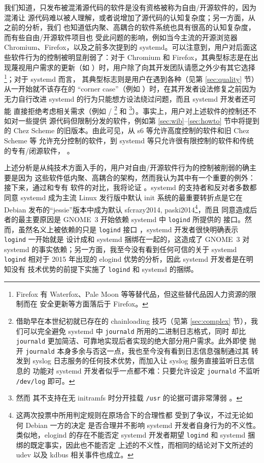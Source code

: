 我们知道，只发布被混淆源代码的软件是没有资格被称为自由/开源软件的，因为混淆让
源代码难以被人理解，或者说增加了源代码的认知复杂度；另一方面，从之前的分析，我们
也知道低内聚、高耦合的软件系统也具有很高的认知复杂度，而有些自由/开源软件项目也
受此问题的影响，例如当今主流的开源浏览器 Chromium、Firefox，以及之前多次提到的
systemd。可以注意到，用户对后面这些软件行为的控制被明显削弱了：对于 Chromium
和 Firefox，其典型标志是在出现蔑视用户需求的更新（如 \parencite{beauhd2019,
namelessvoice2018}）时，用户除了向其开发团队请愿之外少有其它选择\footnote{%
Firefox 有 Waterfox、Pale Moon 等等替代品，但这些替代品因人力资源的限制而在
安全更新等方面落后于 Firefox。}；对于 systemd 而言，
其典型标志则是用户在遇到各种（见第 \ref{sec:quality} 节）从一开始就不该存在的
“corner case”（例如 \parencite{ratagupt2017}）时，在其开发者设法修复之前因为
无力自行改进 systemd 的行为只能想方设法绕过问题，而且 systemd 开发者还可能
直接拒绝考虑相关需求（例如 \parencite{akcaagac2013}/\parencite{junta2017}%
\footnote{借助早在本世纪初就已存在的 chainloading 技巧（见第 \ref{sec:complex}
节），我们可以完全避免 systemd 中 \texttt{journald} 所用的二进制日志格式，同时
却比 \texttt{journald} 更加简洁、可靠地实现后者实现的绝大部分用户需求。此外即使
抛开 \texttt{journald} 本身多余与否这一点，我也至今没有看到日志信息强制通过其
转发到 syslog 日志服务的任何技术优势，而加入让 syslog 服务直接监听日志信息的
功能对 systemd 开发者似乎一点都不难：只要允许设定 \texttt{journald} 不监听
\texttt{/dev/log} 即可。} 和 \parencite{freedesktop:sepusr}\footnote{然而
其不支持在无 initramfs 时分开挂载 \texttt{/usr} 的论据可谓非常薄弱%
。}）。事实上，用户对上述软件的控制还不如对一些提供
源代码但限制分发的软件，例如第 \ref{sec:wib}--\ref{sec:howto} 节中将提到的
Chez Scheme 的旧版本。由此可见，从 s6 等允许高度控制的软件和旧 Chez Scheme 等
允许充分控制的软件，到 systemd 等只允许很有限控制的软件和传统的专有/闭源软件，%
。

上述分析是从纯技术方面入手的，用户对自由/开源软件行为的控制被削弱的确主要是因为
这些软件低内聚、高耦合的架构，然而我认为其中有一个重要的例外：接下来，通过和专有
软件的对比，我将论证 。systemd 的支持者和反对者多数都同意 systemd 成为主流 Linux 发行版中默认
init 系统的最重要转折点是它在 Debian 发布的“jessie”版本中成为默认\cupercite%
{sfcrazy2014, paski2014}\footnote{这两次投票中所用判定规则在原场合下的合理性都
受到了争议，不过无论如何 Debian 一方的决定
是否合理并不影响 systemd 开发者自身行为的不义性。类似地，elogind 的存在不能否定
systemd 开发者期望 \texttt{logind} 和 systemd 捆绑的既定事实，因此也不能否定
上述的不义性，而相同的结论对下文所述的 udev 以及 kdbus 相关事件也成立。}，而且
同意造成后者的最主要原因是 GNOME~3 开始依赖 systemd 中 \verb|logind| 所提供的
接口。然而，虽然名义上被依赖的只是 \verb|logind| 接口%
，systemd 开发者很快明确表示 \verb|logind| 一开始就是
设计成和 systemd 捆绑在一起的，这造成了 GNOME~3 对
systemd 的事实依赖；另一方面，我至今没有看到任何可信的关于 systemd \verb|logind|
相对于 2015 年出现的 elogind 优势的分析，因此 systemd 开发者是在明知没有
技术优势的前提下实施了 \verb|logind| 和 systemd 的捆绑。

